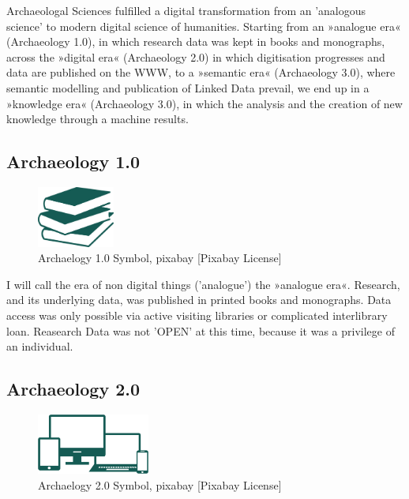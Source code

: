 \documentclass[twocolumn]{autart}
\begin{document}
Archaeologal Sciences fulfilled a digital transformation from an 'analogous science' to modern digital science of humanities. Starting from an »analogue era« (Archaeology 1.0), in which research data was kept in books and monographs, across the »digital era« (Archaeology 2.0) in which digitisation progresses and data are published on the WWW, to a »semantic era« (Archaeology 3.0), where semantic modelling and publication of Linked Data prevail, we end up in a »knowledge era« (Archaeology 3.0), in which the analysis and the creation of new knowledge through a machine results.

\subsection{Archaeology 1.0}

\begin{figure}[!htb]
\begin{center}
\includegraphics[height=2cm]{a10.png}    %
\caption{Archaelogy 1.0 Symbol, pixabay [Pixabay License]}  %
\label{figa10symbol}                                 %
\end{center}                                 %
\end{figure}

I will call the era of non digital things ('analogue') the »analogue era«. Research, and its underlying data, was published in printed books and monographs. Data access was only possible via active visiting libraries or complicated interlibrary loan. Reasearch Data was not 'OPEN' at this time, because it was a privilege of an individual. 

\subsection{Archaeology 2.0}

\begin{figure}[!htb]
\begin{center}
\includegraphics[height=2cm]{a20.png}    %
\caption{Archaelogy 2.0 Symbol, pixabay [Pixabay License]}  %
\label{figa20symbol}                                 %
\end{center}                                 %
\end{figure}
\end{document}
